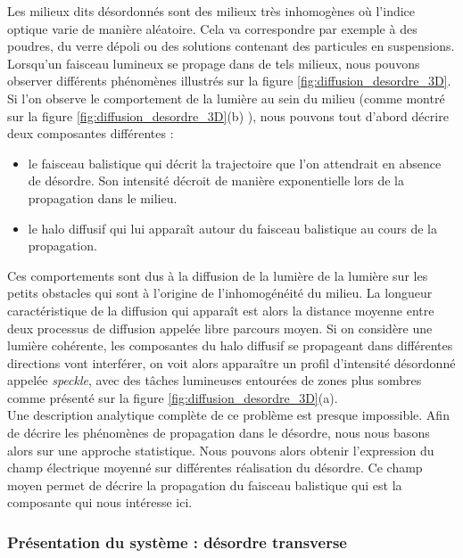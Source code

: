 \documentclass[a4paper,11pt]{article} %
\begin{document}
	Les milieux dits désordonnés sont des milieux très inhomogènes où l'indice optique varie de manière aléatoire. Cela va correspondre par exemple à des poudres, du verre dépoli ou des solutions contenant des particules en suspensions. Lorsqu'un faisceau lumineux se propage dans de tels milieux, nous pouvons observer différents phénomènes illustrés sur la figure \ref{fig:diffusion_desordre_3D}. Si l'on observe le comportement de la lumière au sein du milieu (comme montré sur la figure \ref{fig:diffusion_desordre_3D}(b) ), nous pouvons tout d'abord décrire deux  composantes différentes :
	\begin{itemize}
		\item le faisceau balistique qui décrit la trajectoire que l'on attendrait en absence de désordre. Son intensité décroit de manière exponentielle lors de la propagation dans le milieu.
		\item le halo diffusif qui lui apparaît autour du faisceau balistique au cours de la propagation.
	\end{itemize}
	Ces comportements sont dus à la diffusion de la lumière de la lumière sur les petits obstacles qui sont à l'origine de l'inhomogénéité du milieu. La longueur caractéristique de la diffusion qui apparaît est alors la distance moyenne entre deux processus de diffusion appelée libre parcours moyen. Si on considère une lumière cohérente, les composantes du halo diffusif se propageant dans différentes directions vont interférer, on voit alors apparaître un profil d'intensité désordonné appelée \textit{speckle}, avec des tâches lumineuses entourées de zones plus sombres comme présenté sur la figure \ref{fig:diffusion_desordre_3D}(a).\\
	
	Une description analytique complète de ce problème est presque impossible. Afin de décrire les phénomènes de propagation dans le désordre, nous nous basons alors sur une approche statistique. Nous pouvons alors obtenir l'expression du champ électrique moyenné sur différentes réalisation du désordre. Ce champ moyen permet de décrire la propagation du faisceau balistique qui est la composante qui nous intéresse ici.
	
	
	\subsubsection{Présentation du système : désordre transverse}
	
\end{document}
